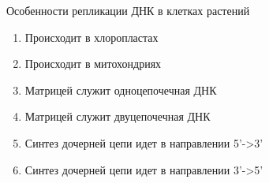
Особенности репликации ДНК в клетках
растений

\begin{enumerate}
    \item Происходит в хлоропластах 
    \item Происходит в митохондриях 
    \item Матрицей служит одноцепочечная ДНК 
    \item Матрицей служит двуцепочечная ДНК 
    \item Синтез дочерней цепи идет в направлении 5’->3’
    \item Синтез дочерней цепи идет в направлении 3’->5’
\end{enumerate}



